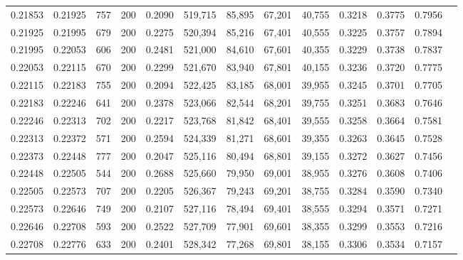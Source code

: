 \begin{tabular}{rrrrrrrrrrrrr}
0.21853 & 0.21925 &   757 & 200 &                                     0.2090 & 519,715 &  85,895 &  67,201 &  40,755 & 0.3218 & 0.3775 & 0.7956 \\
0.21925 & 0.21995 &   679 & 200 &                                     0.2275 & 520,394 &  85,216 &  67,401 &  40,555 & 0.3225 & 0.3757 & 0.7894 \\
0.21995 & 0.22053 &   606 & 200 &                                     0.2481 & 521,000 &  84,610 &  67,601 &  40,355 & 0.3229 & 0.3738 & 0.7837 \\
0.22053 & 0.22115 &   670 & 200 &                                     0.2299 & 521,670 &  83,940 &  67,801 &  40,155 & 0.3236 & 0.3720 & 0.7775 \\
0.22115 & 0.22183 &   755 & 200 &                                     0.2094 & 522,425 &  83,185 &  68,001 &  39,955 & 0.3245 & 0.3701 & 0.7705 \\
0.22183 & 0.22246 &   641 & 200 &                                     0.2378 & 523,066 &  82,544 &  68,201 &  39,755 & 0.3251 & 0.3683 & 0.7646 \\
0.22246 & 0.22313 &   702 & 200 &                                     0.2217 & 523,768 &  81,842 &  68,401 &  39,555 & 0.3258 & 0.3664 & 0.7581 \\
0.22313 & 0.22372 &   571 & 200 &                                     0.2594 & 524,339 &  81,271 &  68,601 &  39,355 & 0.3263 & 0.3645 & 0.7528 \\
0.22373 & 0.22448 &   777 & 200 &                                     0.2047 & 525,116 &  80,494 &  68,801 &  39,155 & 0.3272 & 0.3627 & 0.7456 \\
0.22448 & 0.22505 &   544 & 200 &                                     0.2688 & 525,660 &  79,950 &  69,001 &  38,955 & 0.3276 & 0.3608 & 0.7406 \\
0.22505 & 0.22573 &   707 & 200 &                                     0.2205 & 526,367 &  79,243 &  69,201 &  38,755 & 0.3284 & 0.3590 & 0.7340 \\
0.22573 & 0.22646 &   749 & 200 &                                     0.2107 & 527,116 &  78,494 &  69,401 &  38,555 & 0.3294 & 0.3571 & 0.7271 \\
0.22646 & 0.22708 &   593 & 200 &                                     0.2522 & 527,709 &  77,901 &  69,601 &  38,355 & 0.3299 & 0.3553 & 0.7216 \\
0.22708 & 0.22776 &   633 & 200 &                                     0.2401 & 528,342 &  77,268 &  69,801 &  38,155 & 0.3306 & 0.3534 & 0.7157 \\

\end{tabular}
